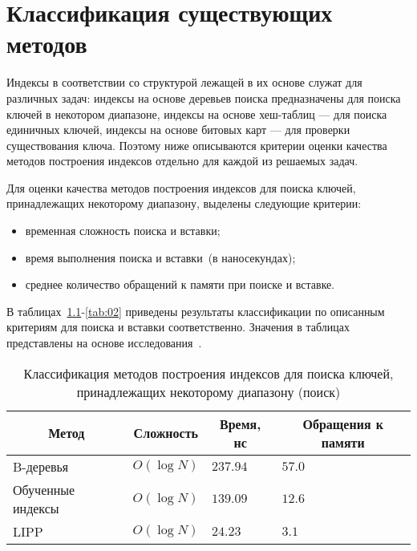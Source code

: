 \chapter{Классификация существующих методов\label{classification}}

Индексы в соответствии со структурой лежащей в их основе служат для различных
задач: индексы на основе деревьев поиска предназначены для поиска ключей в
некотором диапазоне, индексы на основе хеш-таблиц --- для поиска единичных
ключей, индексы на основе битовых карт --- для проверки существования ключа.
Поэтому ниже описываются критерии оценки качества методов построения индексов
отдельно для каждой из решаемых задач.

Для оценки качества методов построения индексов для поиска ключей, принадлежащих
некоторому диапазону, выделены следующие критерии:
\begin{itemize}
    \item временная сложность поиска и вставки;
    \item время выполнения поиска и вставки~(в наносекундах);
    \item среднее количество обращений к памяти при поиске и вставке.
\end{itemize}

В таблицах~\ref{tab:01}-\ref{tab:02} приведены результаты классификации по
описанным критериям для поиска и вставки соответственно. Значения в таблицах
представлены на основе исследования~\cite{ulipp}.

{
\captionsetup{format=hang,justification=raggedright,
              singlelinecheck=off,width=16.8cm}
\begin{longtable}[Hc]{|p{5cm}|p{2cm}|p{2cm}|p{2cm}|}
\caption{Классификация методов построения индексов для поиска ключей,
принадлежащих некоторому диапазону (поиск)\label{tab:01}}\\
    \hline
    \multicolumn{1}{|c}{\textbf{Метод}} &
    \multicolumn{1}{|c|}{\textbf{Сложность}} &
    \multicolumn{1}{|c|}{\textbf{Время, нс}} &
    \multicolumn{1}{c|}{\parbox{3cm}{\vspace{2mm}\centering\textbf{Обращения к
    памяти}}}\\[2.5ex]
    \hline
    B-деревья & $O(\log N)$
    & $237.94$
    & $57.0$\\
    \hline
    Обученные индексы & $O(\log N)$
    & $139.09$
    & $12.6$\\
    \hline
    LIPP & $O(\log N)$
    & $24.23$
    & $3.1$\\
    \hline
\end{longtable}
}

